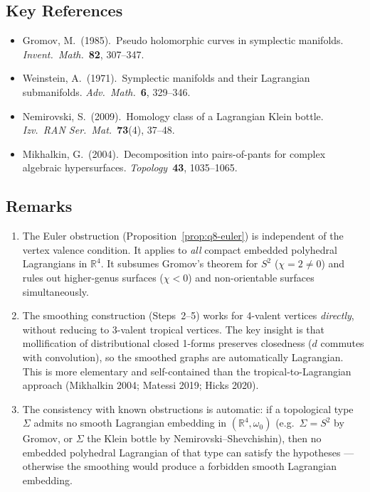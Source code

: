 \subsection*{Key References}
\begin{itemize}
\item Gromov, M.\ (1985).\ Pseudo holomorphic curves in symplectic manifolds.
  \emph{Invent.\ Math.}\ \textbf{82}, 307--347.
\item Weinstein, A.\ (1971).\ Symplectic manifolds and their Lagrangian submanifolds.
  \emph{Adv.\ Math.}\ \textbf{6}, 329--346.
\item Nemirovski, S.\ (2009).\ Homology class of a Lagrangian Klein bottle.
  \emph{Izv.\ RAN Ser.\ Mat.}\ \textbf{73}(4), 37--48.
\item Mikhalkin, G.\ (2004).\ Decomposition into pairs-of-pants for complex algebraic hypersurfaces.
  \emph{Topology}\ \textbf{43}, 1035--1065.
\end{itemize}

\subsection*{Remarks}

\begin{enumerate}
\item The Euler obstruction (Proposition~\ref{prop:q8-euler}) is independent of the vertex
  valence condition.  It applies to \emph{all} compact embedded polyhedral Lagrangians
  in $\mathbb R^4$.  It subsumes Gromov's theorem for $S^2$ ($\chi=2\ne0$)
  and rules out higher-genus surfaces ($\chi<0$) and non-orientable surfaces simultaneously.

\item The smoothing construction (Steps~2--5) works for 4-valent vertices \emph{directly},
  without reducing to 3-valent tropical vertices.
  The key insight is that mollification of distributional closed 1-forms preserves closedness
  ($d$ commutes with convolution), so the smoothed graphs are automatically Lagrangian.
  This is more elementary and self-contained than the tropical-to-Lagrangian approach
  (Mikhalkin 2004; Matessi 2019; Hicks 2020).

\item The consistency with known obstructions is automatic: if a topological type $\Sigma$ admits
  no smooth Lagrangian embedding in $(\mathbb R^4,\omega_0)$ (e.g.\ $\Sigma=S^2$ by Gromov,
  or $\Sigma$ the Klein bottle by Nemirovski--Shevchishin), then no embedded polyhedral Lagrangian
  of that type can satisfy the hypotheses --- otherwise the smoothing would produce a
  forbidden smooth Lagrangian embedding.
\end{enumerate}

